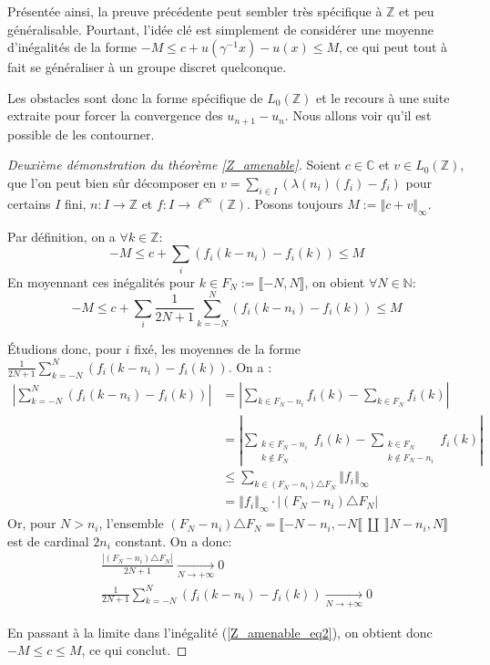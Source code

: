 \documentclass[a4paper,12pt]{article}
\newcommand{\N}{\mathbb{N}}
\newcommand{\Z}{\mathbb{Z}}
\newcommand{\C}{\mathbb{C}}
\newcommand{\norm}[1]{\left\Vert #1\right\Vert}
\newcommand{\abs}[1]{\left\vert#1\right\vert}
\newcommand{\card}[1]{\abs{#1}}
\newcommand{\inv}{^{-1}}
\begin{document}
Présentée ainsi, la preuve précédente peut sembler très spécifique à $\Z$ et peu généralisable. Pourtant, l'idée clé 
est simplement de considérer une \og{}moyenne\fg{} d'inégalités de la forme $-M\le c + u(\gamma\inv x) - u(x)\le M$, 
ce qui peut tout à fait se généraliser à un groupe discret quelconque. 

Les obstacles sont donc la forme spécifique de $L_0(\Z)$ et le recours à une suite extraite pour forcer la convergence des $u_{n+1}-u_n$. Nous allons voir 
qu'il est possible de les contourner.

\begin{proof}[Deuxième démonstration du théorème \ref{Z_amenable}]
    Soient $c\in\C$ et $v\in L_0(\Z)$, que l'on peut bien sûr décomposer en $v = \sum_{i\in I} (\lambda(n_i)(f_i) - f_i)$ pour certains $I$ fini, $n : I \to\Z$ et
    $f : I\to\ell^\infty(\Z)$. Posons toujours $M := \norm{c + v}_\infty$.

    Par définition, on a $\forall k\in\Z$:
    \begin{equation*}
        -M \le c + \sum_i (f_i(k-n_i) - f_i(k)) \le M
    \end{equation*}
    En moyennant ces inégalités pour $k\in F_N := \llbracket-N,N\rrbracket$, on obient $\forall N\in\N$:
    \begin{equation}\label{Z_amenable_eq2}
        -M \le c + \sum_i \frac1{2N+1} \sum_{k=-N}^N (f_i(k-n_i) - f_i(k)) \le M
    \end{equation}

    Étudions donc, pour $i$ fixé, les moyennes de la forme $\frac1{2N+1} \sum_{k=-N}^N (f_i(k-n_i) - f_i(k))$. On a :
    \begin{align*}
        \abs{\sum_{k=-N}^N (f_i(k-n_i) - f_i(k))} &= \abs{\sum_{k\in F_N - n_i} f_i(k) - \sum_{k\in F_N}f_i(k)} \\
            &= \abs{\sum_{\substack{k\in F_N - n_i \\ k\notin F_N}} f_i(k) -
            \sum_{\substack{k\in F_N \\ k\notin F_N-n_i}} f_i(k)} \\
            &\le \sum_{k\in (F_N-n_i)\triangle F_N} \norm{f_i}_\infty \\
            &=\norm{f_i}_\infty \cdot \card{(F_N-n_i)\triangle F_N}
    \end{align*}
    Or, pour $N>n_i$, l'ensemble $(F_N-n_i)\triangle F_N = \llbracket -N-n_i, -N\llbracket\ \amalg\ \rrbracket N-n_i, N\rrbracket$ est de cardinal $2n_i$ constant.
    On a donc:
    \begin{gather*}
        \frac{\card{(F_N-n_i)\triangle F_N}}{2N+1} \xrightarrow[N\to+\infty]{} 0 \\
        \frac1{2N+1} \sum_{k=-N}^N (f_i(k-n_i) - f_i(k)) \xrightarrow[N\to+\infty]{} 0
    \end{gather*}

    En passant à la limite dans l'inégalité (\ref{Z_amenable_eq2}), on obtient donc $-M\le c\le M$, ce qui conclut.
\end{proof}
\end{document}

